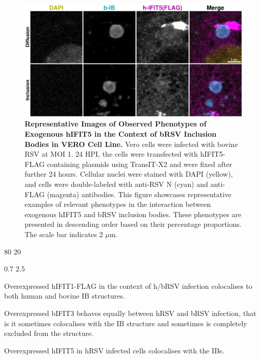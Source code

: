 \begin{figure}
    \centering
    \includegraphics[width=1\linewidth]{09. Chapter 4/Figs/02. Overexpression/04. IFIT5/06. i5-brsv.pdf}
    \caption[Representative Images of Observed Phenotypes of Exogenous hIFIT5 in the Context of bRSV Inclusion Bodies in VERO Cell Line.]{\textbf{Representative Images of Observed Phenotypes of Exogenous hIFIT5 in the Context of bRSV Inclusion Bodies in VERO Cell Line.} Vero cells were infected with bovine RSV at MOI 1. 24 HPI, the cells were transfected with hIFIT5-FLAG containing plasmids using TransIT-X2 and were fixed after further 24 hours. Cellular nuclei were stained with DAPI (yellow), and cells were double-labeled with anti-RSV N (cyan) and anti-FLAG (magenta) antibodies. This figure showcases representative examples of relevant phenotypes in the interaction between exogenous hIFIT5 and bRSV inclusion bodies. These phenotypes are presented in descending order based on their percentage proportions. The scale bar indicates 2 \(\mu \mbox{m}\).}
    \label{fig:Representative Images of Observed Phenotypes of Exogenous hIFIT5 in the Context of bRSV Inclusion Bodies in VERO Cell Line}
\end{figure}

80 20

0.7 2.5

Overexpressed hIFIT1-FLAG in the context of h/bRSV infection colocalises to both human and bovine IB structures.

Overexpressed bIFIT3 behaves equally between hRSV and bRSV infection, that is it sometimes colocalises with the IB structure and sometimes is completely excluded from the structure.

Overexpressed hIFIT5 in hRSV infected cells colocalises with the IBs.
